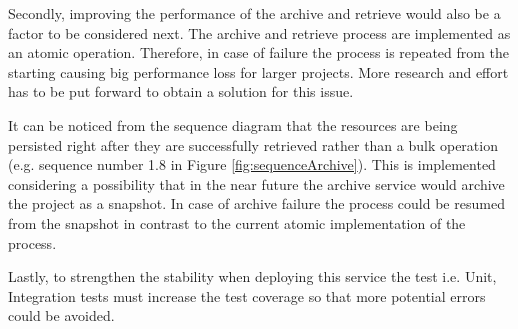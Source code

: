Secondly, improving the performance of the archive and retrieve would also be a factor to be considered next. The archive and retrieve process are implemented as
an atomic operation. Therefore, in case of failure the process is repeated from the starting causing big performance loss for larger projects. More research and effort
has to be put forward to obtain a solution for this issue. 

It can be noticed from the sequence diagram that the resources are being persisted right after they are successfully retrieved rather than a bulk operation
(e.g. sequence number 1.8 in Figure \ref{fig:sequenceArchive}). This
is implemented considering a possibility that in the near future the archive service would archive the project as a snapshot. In case of archive failure the process
could be resumed from the snapshot in contrast to the current atomic implementation of the process.

Lastly, to strengthen the stability when deploying this service the test i.e. Unit, Integration tests must increase the test coverage so that more potential
errors could be avoided. 


